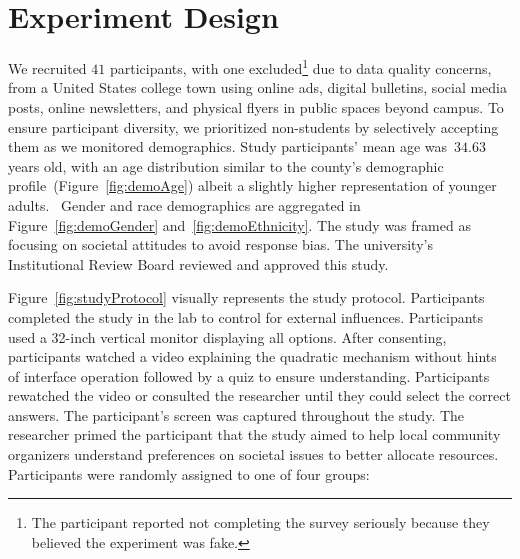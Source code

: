 \section{Experiment Design}
\label{sec:experiment}
We recruited $41$ participants, with one excluded\footnote{The participant reported not completing the survey seriously because they believed the experiment was fake.} due to data quality concerns, from a United States college town using online ads, digital bulletins, social media posts, online newsletters, and physical flyers in public spaces beyond campus. To ensure participant diversity, we prioritized non-students by selectively accepting them as we monitored demographics. Study participants' mean age was~$34.63$ years old, with an age distribution similar to the county's demographic profile~(Figure~\ref{fig:demoAge}) albeit a slightly higher representation of younger adults.~ Gender and race demographics are aggregated in Figure~\ref{fig:demoGender} and~\ref{fig:demoEthnicity}. The study was framed as focusing on societal attitudes to avoid response bias. The university's Institutional Review Board reviewed and approved this study. 

Figure~\ref{fig:studyProtocol} visually represents the study protocol. Participants completed the study in the lab to control for external influences. Participants used a 32-inch vertical monitor displaying all options. After consenting, participants watched a video explaining the quadratic mechanism without hints of interface operation followed by a quiz to ensure understanding. Participants rewatched the video or consulted the researcher until they could select the correct answers. The participant's screen was captured throughout the study. The researcher primed the participant that the study aimed to help local community organizers understand preferences on societal issues to better allocate resources. Participants were randomly assigned to one of four groups:

